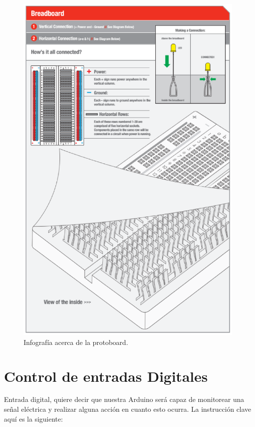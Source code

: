 \documentclass[letterpaper, 10pt]{report}
\begin{document}
\begin{figure}
\centering
\includegraphics[scale=0.7]{protoboard.png}
\caption{Infografía acerca de la protoboard. \cite{SIK} \label{protoboard}}
\end{figure}

\newpage

\section{Control de entradas Digitales}

Entrada digital, quiere decir que nuestra Arduino será capaz de monitorear una señal eléctrica y realizar alguna acción en cuanto esto ocurra. La instrucción clave aquí es la siguiente:
\end{document}
